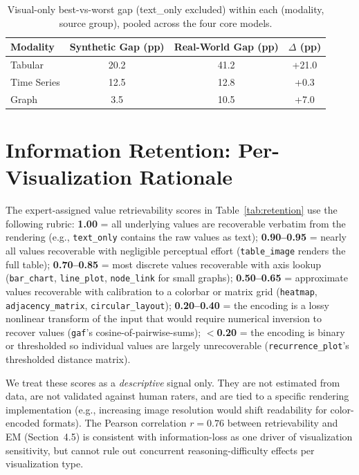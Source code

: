 \documentclass{article}
\begin{document}
\begin{table}[h]
\centering
\small
\caption{Visual-only best-vs-worst gap (text\_only excluded) within each (modality, source group), pooled across the four core models.}
\label{tab:source_sens}
\begin{tabular}{l ccc}
\toprule
Modality & Synthetic Gap (pp) & Real-World Gap (pp) & $\Delta$ (pp) \\
\midrule
Tabular     & 20.2 & 41.2 & +21.0 \\
Time Series & 12.5 & 12.8 & +0.3  \\
Graph       & 3.5  & 10.5 & +7.0  \\
\bottomrule
\end{tabular}
\end{table}

\section{Information Retention: Per-Visualization Rationale}
\label{sec:retention_rationale}
The expert-assigned value retrievability scores in Table~\ref{tab:retention} use the following rubric: \textbf{1.00} = all underlying values are recoverable verbatim from the rendering (e.g., \texttt{text\_only} contains the raw values as text); \textbf{0.90--0.95} = nearly all values recoverable with negligible perceptual effort (\texttt{table\_image} renders the full table); \textbf{0.70--0.85} = most discrete values recoverable with axis lookup (\texttt{bar\_chart}, \texttt{line\_plot}, \texttt{node\_link} for small graphs); \textbf{0.50--0.65} = approximate values recoverable with calibration to a colorbar or matrix grid (\texttt{heatmap}, \texttt{adjacency\_matrix}, \texttt{circular\_layout}); \textbf{0.20--0.40} = the encoding is a lossy nonlinear transform of the input that would require numerical inversion to recover values (\texttt{gaf}'s cosine-of-pairwise-sums); \textbf{$<$0.20} = the encoding is binary or thresholded so individual values are largely unrecoverable (\texttt{recurrence\_plot}'s thresholded distance matrix).

We treat these scores as a \emph{descriptive} signal only. They are not estimated from data, are not validated against human raters, and are tied to a specific rendering implementation (e.g., increasing image resolution would shift readability for color-encoded formats). The Pearson correlation $r=0.76$ between retrievability and EM (Section~4.5) is consistent with information-loss as one driver of visualization sensitivity, but cannot rule out concurrent reasoning-difficulty effects per visualization type.
\end{document}
